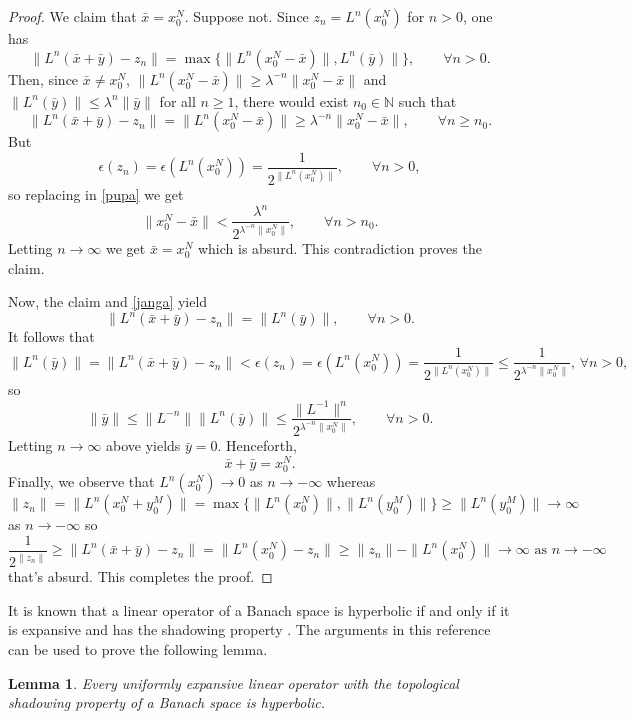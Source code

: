 \documentclass[11pt,letterpaper]{amsart}
\newtheorem{lem}{Lemma}
\numberwithin{equation}{section}
\begin{document}
\begin{proof}
We claim that $\bar{x}=x_0^N$.
Suppose not. Since $z_n=L^n(x_0^N)$ for $n>0$, one has
\begin{equation}
\label{janga}
\|L^n(\bar{x}+\bar{y})-z_n\|=\max\{\|L^n(x_0^N-\bar{x})\|,L^n(\bar{y})\|\},\quad\quad\forall n>0.
\end{equation}
Then, since $\bar{x}\neq x^N_0$, $\|L^n(x_0^N-\bar{x})\|\geq \lambda^{-n}\|x^N_0-\bar{x}\|$ and $\|L^n(\bar{y})\|\leq\lambda^n\|\bar{y}\|$ for all $n\geq1$, there would exist $n_0\in\mathbb{N}$ such that
$$
\| L^n(\bar{x}+\bar{y})-z_n\|=\|L^n(x_0^N-\bar{x})\|\geq \lambda^{-n}\|x_0^N-\bar{x}\|,\quad\quad\forall n\geq n_0.
$$
But
$$
\epsilon(z_n)=\epsilon(L^n(x^N_0))=\frac{1}{2^{\|L^n(x^N_0)\|}},
\quad\quad\forall n>0,
$$
so replacing in \eqref{pupa} we get
$$
\|x_0^N-\bar{x}\|<\frac{\lambda^n}{2^{\lambda^{-n}\|x^N_0\|}},\quad\quad\forall n>n_0.
$$
Letting $n\to\infty$ we get $\bar{x}=x^N_0$ which is absurd.
This contradiction proves the claim.

Now, the claim and \eqref{janga} yield
$$
\|L^n(\bar{x}+\bar{y})-z_n\|=\|L^n(\bar{y})\|,
\quad\quad\forall n>0.
$$
It follows that
$$
\|L^n(\bar{y})\|=\|L^n(\bar{x}+\bar{y})-z_n\|<\epsilon(z_n)=\epsilon(L^n(x^N_0))=\frac{1}{2^{\|L^n(x_0^N)\|}}\leq \frac{1}{2^{\lambda^{-n}\|x_0^N\|}},\,\forall n>0,
$$
so
$$
\|\bar{y}\|\leq \|L^{-n}\|\|L^n(\bar{y})\|\leq \frac{\|L^{-1}\|^n}{2^{\lambda^{-n}\|x_0^N\|}},\quad\quad\forall n>0.
$$
Letting $n\to\infty$ above yields $\bar{y}=0$. Henceforth,
$$
\bar{x}+\bar{y}=x^N_0.
$$
Finally, we observe that $L^n(x^N_0)\to 0$ as $n\to-\infty$
whereas
$$
\|z_n\|=\|L^n(x^N_0+y^M_0)\|=\max\{\|L^n(x^N_0)\|,\|L^n(y^M_0)\|\}\geq \|L^n(y^M_0)\|\to\infty
$$
as
$n\to-\infty$
so
$$
\frac{1}{2^{\|z_n\|}}\geq \|L^n(\bar{x}+\bar{y})-z_n\|=\|L^n(x^N_0)-z_n\|
\geq \|z_n\|-\|L^n(x^N_0)\|\to\infty\mbox{ as } n\to-\infty
$$
that's absurd. This completes the proof.
\end{proof}

It is known that a linear operator of a Banach space is hyperbolic if and only if it is expansive and has the shadowing property \cite{bm}.
The arguments in this reference can be used to prove the following lemma.

\begin{lem}
\label{putin}
Every uniformly expansive linear operator with the topological shadowing property of a Banach space is hyperbolic.
\end{lem}
\end{document}

